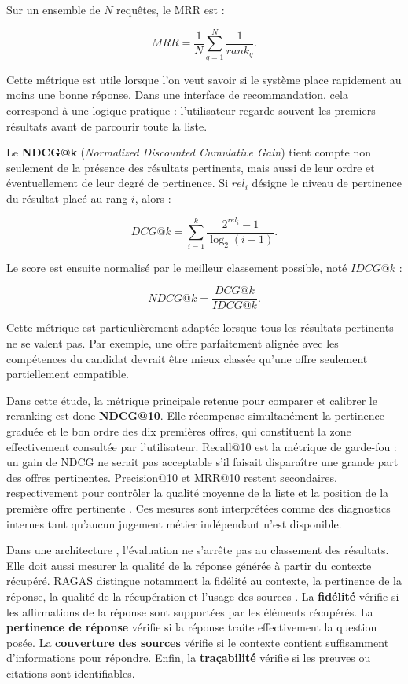 Sur un ensemble de $N$ requêtes, le MRR est :

\begin{equation}
MRR=\frac{1}{N}\sum_{q=1}^{N}\frac{1}{rank_q}.
\end{equation}

Cette métrique est utile lorsque l'on veut savoir si le système place rapidement au moins une bonne réponse. Dans une interface de recommandation, cela correspond à une logique pratique : l'utilisateur regarde souvent les premiers résultats avant de parcourir toute la liste.

Le \textbf{NDCG@k} (\emph{Normalized Discounted Cumulative Gain}) tient compte non seulement de la présence des résultats pertinents, mais aussi de leur ordre et éventuellement de leur degré de pertinence. Si $rel_i$ désigne le niveau de pertinence du résultat placé au rang $i$, alors :

\begin{equation}
DCG@k=\sum_{i=1}^{k}\frac{2^{rel_i}-1}{\log_2(i+1)}.
\end{equation}

Le score est ensuite normalisé par le meilleur classement possible, noté $IDCG@k$ :

\begin{equation}
NDCG@k=\frac{DCG@k}{IDCG@k}.
\end{equation}

Cette métrique est particulièrement adaptée lorsque tous les résultats pertinents ne se valent pas. Par exemple, une offre parfaitement alignée avec les compétences du candidat devrait être mieux classée qu'une offre seulement partiellement compatible.

Dans cette étude, la métrique principale retenue pour comparer et calibrer le reranking est donc \textbf{NDCG@10}. Elle récompense simultanément la pertinence graduée et le bon ordre des dix premières offres, qui constituent la zone effectivement consultée par l'utilisateur. Recall@10 est la métrique de garde-fou : un gain de NDCG ne serait pas acceptable s'il faisait disparaître une grande part des offres pertinentes. Precision@10 et MRR@10 restent secondaires, respectivement pour contrôler la qualité moyenne de la liste et la position de la première offre pertinente \cite{thakur2021beir,muennighoff2022mteb}. Ces mesures sont interprétées comme des diagnostics internes tant qu'aucun jugement métier indépendant n'est disponible.

Dans une architecture \RAG{}, l'évaluation ne s'arrête pas au classement des résultats. Elle doit aussi mesurer la qualité de la réponse générée à partir du contexte récupéré. RAGAS distingue notamment la fidélité au contexte, la pertinence de la réponse, la qualité de la récupération et l'usage des sources \cite{es2024ragas}. La \textbf{fidélité} vérifie si les affirmations de la réponse sont supportées par les éléments récupérés. La \textbf{pertinence de réponse} vérifie si la réponse traite effectivement la question posée. La \textbf{couverture des sources} vérifie si le contexte contient suffisamment d'informations pour répondre. Enfin, la \textbf{traçabilité} vérifie si les preuves ou citations sont identifiables.

